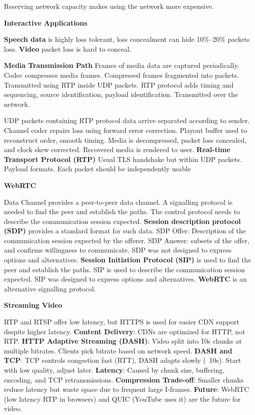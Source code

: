 \documentclass{article}
\begin{document}
Reserving network capacity makes using the network more expensive.

\vspace{\baselineskip}
\textbf{Interactive Applications}

\textbf{Speech data} is highly loss tolerant, loss concealment can hide 10\%--20\% packets loss.
\textbf{Video} packet loss is hard to conceal.

\textbf{Media Transmission Path}
Frames of media data are captured periodically.
Codec compresses media frames.
Compressed frames fragmented into packets.
Transmitted using RTP inside UDP packets.
RTP protocol adds timing and sequencing, source identification, payload identification.
Transmitted over the network.

UDP packets containing RTP protocol data arrive separated according to sender.
Channel coder repairs loss using forward error correction.
Playout buffer used to reconstruct order, smooth timing.
Media is decompressed, packet loss concealed, and clock skew corrected.
Recovered media is rendered to user.
\textbf{Real-time Transport Protocol (RTP)}
Usual TLS handshake but within UDP packets.
Payload formats.
Each packet should be independently usable

\vspace{\baselineskip}
\textbf{WebRTC}

Data Channel provides a peer-to-peer data channel.
A signalling protocol is needed to find the peer and establish the paths.
The control protocol needs to describe the communication session expected.
\textbf{Session description protocol (SDP)} provides a standard format for such data.
SDP Offer: Description of the communication session expected by the offerer.
SDP Answer: subsets of the offer, and confirms willingness to communicate.
SDP was not designed to express options and alternatives.
\textbf{Session Initiation Protocol (SIP)} is used to find the peer and establish the paths.
SIP is used to describe the communication session expected.
SIP was designed to express options and alternatives.
\textbf{WebRTC} is an alternative signalling protocol.

\vspace{\baselineskip}
\textbf{Streaming Video}

RTP and RTSP offer low latency, but HTTPS is used for easier CDN support despite higher latency.
\textbf{Content Delivery}:
CDNs are optimized for HTTP, not RTP\@.
\textbf{HTTP Adaptive Streaming (DASH)}:
Video split into \~10s chunks at multiple bitrates. Clients pick bitrate based on network speed.
\textbf{DASH and TCP}:
TCP controls congestion fast (RTT), DASH adapts slowly (~10s). Start with low quality, adjust later.
\textbf{Latency}:
Caused by chunk size, buffering, encoding, and TCP retransmissions.
\textbf{Compression Trade-off}:
Smaller chunks reduce latency but waste space due to frequent large I-frames.
\textbf{Future}:
WebRTC (low latency RTP in browsers) and QUIC (YouTube uses it) are the future for video.
\end{document}
